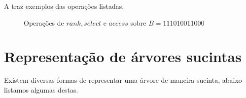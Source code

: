 A  traz exemplos das operações listadas.
\begin{figure}[!ht]
\centering
  \caption[Operações sobre vetores de bits]{Operações de $rank, select$ e $access$ sobre $B=111010011000$}
  \label{fig:bitvector-operations}
\end{figure}

\section{Representação de árvores sucintas}
Existem diversas formas de representar  uma árvore de maneira sucinta, abaixo listamos algumas destas.

